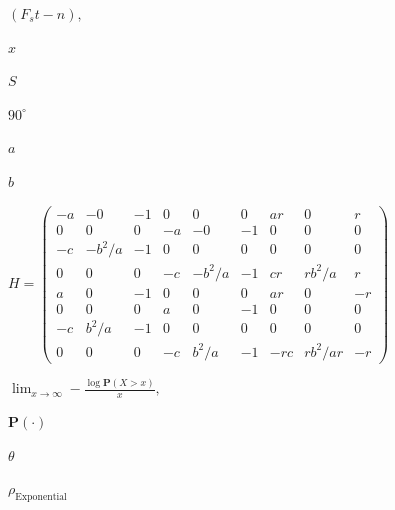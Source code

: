 \documentclass{article}
\def\lthtmlcheckvsize{\ifdim\ht\sizebox<\vsize 
  \ifdim\wd\sizebox<\hsize\expandafter\hfill\fi \expandafter\vfill
  \else\expandafter\vss\fi}%
\begin{document}
{\newpage\clearpage
{}%
$\displaystyle (F_s t - n),
$%
\lthtmlindisplaymathZ
\lthtmlcheckvsize\clearpage}

{\newpage\clearpage
{}%
$ x$%
\lthtmlindisplaymathZ
\lthtmlcheckvsize\clearpage}

{\newpage\clearpage
{}%
$ S$%
\lthtmlindisplaymathZ
\lthtmlcheckvsize\clearpage}

{\newpage\clearpage
{}%
$ 90^{\circ}$%
\lthtmlindisplaymathZ
\lthtmlcheckvsize\clearpage}

{\newpage\clearpage
{}%
$ a$%
\lthtmlindisplaymathZ
\lthtmlcheckvsize\clearpage}

{\newpage\clearpage
{}%
$ b$%
\lthtmlindisplaymathZ
\lthtmlcheckvsize\clearpage}

{\newpage\clearpage
{}%
$\displaystyle H=
\begin{pmatrix}
  -a &-0 &-1 &0 &0 &0 &ar &0 &r \\
  0 &0 &0 &-a &-0 &-1 & 0& 0 &0 \\
  -c &-b^2/a& -1& 0& 0& 0 &0& 0& 0 \\
  0 &0 &0 &-c &-b^2/a &-1 &cr &rb^2/a& r\\
  a &0 &-1& 0& 0 &0 & ar &0 &-r \\
  0 &0 &0 &a &0 &-1 &0 &0 &0\\
  -c &b^2/a& -1& 0& 0& 0& 0& 0& 0 \\
  0 &0 &0 &-c &b^2/a &-1 &-rc &rb^2/ar &-r 
\end{pmatrix}
$%
\lthtmlindisplaymathZ
\lthtmlcheckvsize\clearpage}

{\newpage\clearpage
{}%
$\displaystyle \lim_{x \rightarrow \infty} -\frac{\log\textbf{P}(X > x)}{x},$%
\lthtmlindisplaymathZ
\lthtmlcheckvsize\clearpage}

{\newpage\clearpage
{}%
$ \textbf{P}(\cdot)$%
\lthtmlindisplaymathZ
\lthtmlcheckvsize\clearpage}

{\newpage\clearpage
{}%
$ \theta$%
\lthtmlindisplaymathZ
\lthtmlcheckvsize\clearpage}

{\newpage\clearpage
{}%
$\displaystyle \rho_{\text{Exponential}}$%
\lthtmlindisplaymathZ
\lthtmlcheckvsize\clearpage}
\end{document}
